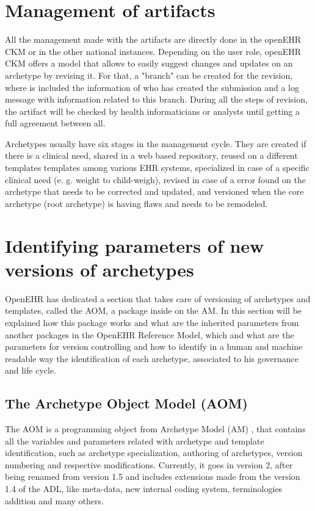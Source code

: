 \documentclass[mim_thesis.tex]{subfiles}
\begin{document}
\section{Management of artifacts}

All the management made with the artifacts are directly done in the openEHR CKM or in the other national instances. Depending on the user role, openEHR CKM offers a model that allows to easily suggest changes and updates on an archetype by revising it. For that, a "branch" can be created for the revision, where is included the information of who has created the submission and a log message with information related to this branch. During all the steps of revision, the artifact will be checked by health informaticians or analysts until getting a full agreement between all. 

Archetypes usually have six stages in the management cycle. They are created if there is a clinical need, shared in a web based repository, reused on a different templates templates among various EHR systems, specialized in case of a specific clinical need (e. g. weight to child-weigh), revised in case of a error found on the archetype that needs to be corrected and updated, and versioned when the core archetype (root archetype) is having flaws and needs to be remodeled. \citep{article2006leslie}


\section{Identifying parameters of new versions of archetypes}

OpenEHR has dedicated a section that takes care of versioning of archetypes and templates, called the \ac{AOM}, a package inside on the \ac{AM}. In this section will be explained how this package works and what are the inherited parameters from another packages in the OpenEHR Reference Model, which and what are the parameters for version controlling and how to identify in a human and machine readable way the identification of each archetype, associated to his governance and life cycle. 

\subsection{The Archetype Object Model (AOM)}
The AOM is a programming object from Archetype Model (AM) \citep{openEHRAOM}, that contains all the variables and parameters related with archetype and template identification, such as archetype specialization, authoring of archetypes, version numbering and respective modifications. Currently, it goes in version 2, after being renamed from version 1.5 and includes extensions made from the version 1.4 of the ADL, like meta-data, new internal coding system, terminologies addition and many others. 
\end{document}
